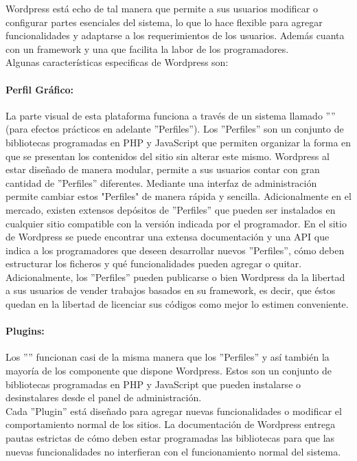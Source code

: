 Wordpress está echo de tal manera que permite a sus usuarios modificar o configurar partes esenciales del sistema, lo que lo hace flexible para agregar funcionalidades y adaptarse a los requerimientos de los usuarios. Además cuanta con un framework y una  que facilita la labor de los programadores.\\

Algunas características especificas de Wordpress son:

\paragraph{Perfil Gráfico:}	
La parte visual de esta plataforma funciona a través de un sistema llamado '''' (para efectos prácticos en adelante ''Perfiles''). Los ''Perfiles'' son un conjunto de bibliotecas programadas en PHP y JavaScript que permiten organizar la forma en que se presentan los contenidos del sitio sin alterar este mismo. Wordpress al estar diseñado de manera modular, permite a sus usuarios contar con gran cantidad de ''Perfiles'' diferentes. Mediante una interfaz de administración permite cambiar estos "Perfiles" de manera rápida y sencilla. Adicionalmente en el mercado, existen extensos depósitos de ''Perfiles'' que pueden ser instalados en cualquier sitio compatible con la versión indicada por el programador.
En el sitio de Wordpress se puede encontrar una extensa documentación y una API que indica a los programadores que deseen desarrollar nuevos ''Perfiles'', cómo deben estructurar los ficheros y qué funcionalidades pueden agregar o quitar. Adicionalmente, los ''Perfiles'' pueden publicarse o bien Wordpress da la libertad a sus usuarios de vender trabajos basados en su framework, es decir, que éstos quedan en la libertad de licenciar sus códigos como mejor lo estimen conveniente.

\paragraph{Plugins:}
Los ''''  funcionan casi de la misma manera que los ''Perfiles'' y así también la mayoría de los componente que dispone Wordpress. Estos son un conjunto de bibliotecas programadas en PHP y JavaScript que pueden instalarse o desinstalares desde el panel de administración.\\
Cada ''Plugin'' está diseñado para agregar nuevas funcionalidades o modificar el comportamiento normal de los sitios. La documentación de Wordpress entrega pautas estrictas de cómo deben estar programadas las bibliotecas para que las nuevas funcionalidades no interfieran con el funcionamiento normal del sistema.

